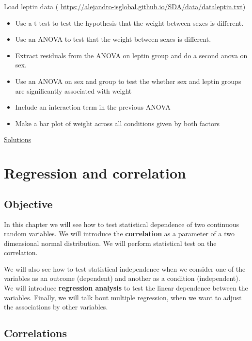 \documentclass[
]{book}
\begin{document}
Load leptin data (
\url{https://alejandro-isglobal.github.io/SDA/data/dataleptin.txt})

\begin{itemize}
\item
  Use a t-test to test the hypothesis that the weight between sexes is different.
\item
  Use an ANOVA to test that the weight between sexes is different.
\item
  Extract residuals from the ANOVA on leptin group and do a second anova on sex.
\item
  Use an ANOVA on sex and group to test the whether sex and leptin groups are significantly associated with weight
\item
  Include an interaction term in the previous ANOVA
\item
  Make a bar plot of weight across all conditions given by both factors
\end{itemize}

\href{https://colab.research.google.com/drive/1K2SlNEd5hNn3lI4XnKsgj1tDeXVyprVE?usp=sharing}{Solutions}

\hypertarget{regression-and-correlation}{%
\chapter{Regression and correlation}\label{regression-and-correlation}}

\hypertarget{objective-13}{%
\section{Objective}\label{objective-13}}

In this chapter we will see how to test statistical dependence of two continuous random variables. We will introduce the \textbf{correlation} as a parameter of a two dimensional normal distribution. We will perform statistical test on the correlation.

We will also see how to test statistical independence when we consider one of the variables as an outcome (dependent) and another as a condition (independent). We will introduce \textbf{regression analysis} to test the linear dependence between the variables. Finally, we will talk bout multiple regression, when we want to adjust the associations by other variables.

\hypertarget{correlations}{%
\section{Correlations}\label{correlations}}
\end{document}
